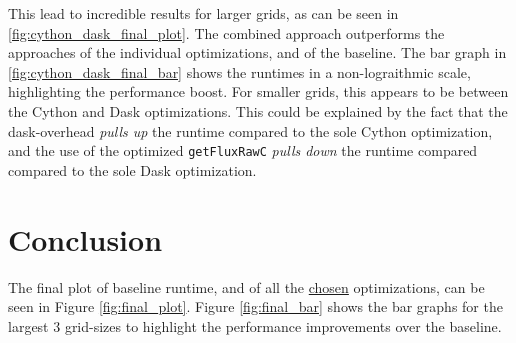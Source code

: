 \documentclass[a4paper,10pt]{article}
\begin{document}
This lead to incredible results for larger grids, as can be seen in \ref{fig:cython_dask_final_plot}.
The combined approach outperforms the approaches of the individual optimizations, and of the baseline.
The bar graph in \ref{fig:cython_dask_final_bar} shows the runtimes in a non-lograithmic scale, highlighting the performance boost.
For smaller grids, this appears to be between the Cython and Dask optimizations.
This could be explained by the fact that the dask-overhead \textit{pulls up} the runtime compared to the sole Cython optimization, and the use of the optimized \verb|getFluxRawC| \textit{pulls down} the runtime compared compared to the sole Dask optimization.

\section{Conclusion}
The final plot of baseline runtime, and of all the \underline{chosen} optimizations, can be seen in Figure \ref{fig:final_plot}.
Figure \ref{fig:final_bar} shows the bar graphs for the largest 3 grid-sizes to highlight the performance improvements over the baseline.
\end{document}
